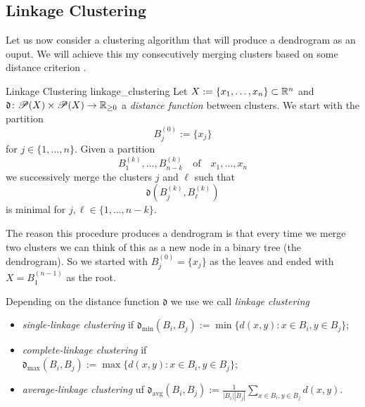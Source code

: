 \subsection{Linkage Clustering}
\label{section__linkage_clustering}
Let us now consider a clustering algorithm that will produce a dendrogram as an ouput. We will achieve this my consecutively merging clusters based on some distance criterion \cite[Sec.~4.2.2]{Everitt2011}.

\begin{definition}{Linkage Clustering }{linkage_clustering}
Let $X := \{x_1, \dots, x_n\} \subset \mathbb R^n$ and $\mathfrak{d}\colon\mathscr{P}(X) \times \mathscr{P}(X) \to \mathbb R_{\geq0}$ a \emph{distance function} between clusters. We start with the partition
$$
B^{(0)}_j := \{x_j\}$$
for $j \in \{1, \dots, n\}$. Given a partition
$$
B^{(k)}_1, \dots, B^{(k)}_{n - k} \quad \text{of} \quad x_1, \dots, x_n
$$
we successively merge the clusters $j$ and $\ell$ such that
$$
\mathfrak{d}(B^{(k)}_j,B^{(k)}_\ell)
$$
is minimal for $j,\ell \in \{1, \dots, n - k\}$.
\end{definition}
The reason this procedure produces a dendrogram is that every time we merge two clusters we can think of this as a new node in a binary tree (the dendrogram). So we started with $B^{(0)}_j = \{x_j\}$ as the leaves and ended with $X = B^{(n-1)}_1$ as the root.


Depending on the distance function $\mathfrak{d}$ we use we call \emph{linkage clustering}

\begin{itemize}
    \item \emph{single-linkage clustering} if $\mathfrak{d}_\mathrm{min} (B_i, B_j) := \min\{d(x,y): x \in B_i, y \in B_j\}$;
    \item \emph{complete-linkage clustering} if $\mathfrak{d}_\mathrm{max} (B_i, B_j) := \max\{d(x,y): x \in B_i, y \in B_j\}$;
    \item \emph{average-linkage clustering} uf $\mathfrak{d}_\mathrm{avg}(B_i,B_j) := \frac{1}{|B_i||B_j|} \sum_{x \in B_i, y \in B_j} d(x,y)$.
\end{itemize}

